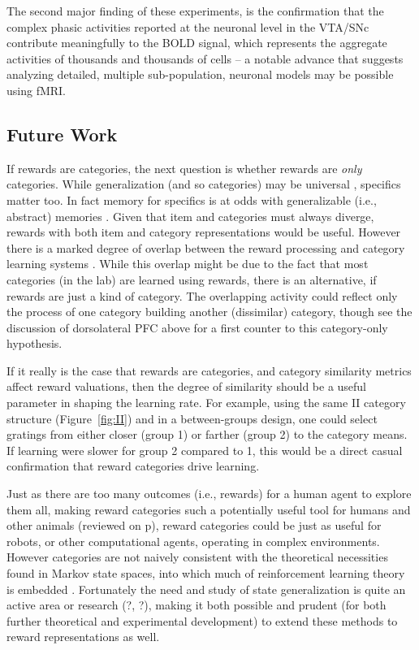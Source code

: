 The second major finding of these experiments, is the confirmation that the complex phasic activities reported at the neuronal level in the VTA/SNc \cite{Kim:2006p1063, Matsumoto:2009p7219,Smith:2011p9101} contribute meaningfully to the BOLD signal, which represents the aggregate activities of thousands and thousands of cells -- a notable advance that suggests analyzing detailed, multiple sub-population, neuronal models may be possible using fMRI.

\subsection{Future Work}
\label{sub:future}
If rewards are categories, the next question is whether rewards are \emph{only} categories.  While generalization (and so categories) may be universal \cite{Shepard:1987p9102}, specifics matter too.  In fact memory for specifics is at odds with generalizable (i.e., abstract) memories \cite{Atallah:2004p5466}. Given that item and categories must always diverge, rewards with both item and category representations would be useful.  However there is a marked degree of overlap between the reward processing and category learning systems \cite{Seger:2010p7189,Ashby:2011p9148}.  While this overlap might be due to the fact that most categories (in the lab) are learned using rewards, there is an alternative, if rewards are just a kind of category.  The overlapping activity could reflect only the process of one category building another (dissimilar) category, though see the discussion of dorsolateral PFC above for a first counter to this category-only hypothesis.

If it really is the case that rewards are categories, and category similarity metrics affect reward valuations, then the degree of similarity should be a useful parameter in shaping the learning rate.  For example, using the same II category structure (Figure~\ref{fig:II}) and in a between-groups design, one could select gratings from either closer (group 1) or farther (group 2) to the category means. If learning were slower for group 2 compared to 1, this would be a direct casual confirmation that reward categories drive learning. 

Just as there are too many outcomes (i.e., rewards) for a human agent to explore them all, making reward categories such a potentially useful tool for humans and other animals (reviewed on p\pageref{sub:gen}), reward categories could be just as useful for robots, or other computational agents, operating in complex environments.   However categories are not naively consistent with the theoretical necessities found in Markov state spaces, into which much of reinforcement learning theory is embedded \cite{Sutton:1998p9247}.  Fortunately the need and study of state generalization is quite an active area or research (?, ?), making it both possible and prudent (for both further theoretical and experimental development) to extend these methods to reward representations as well. 
\clearpage